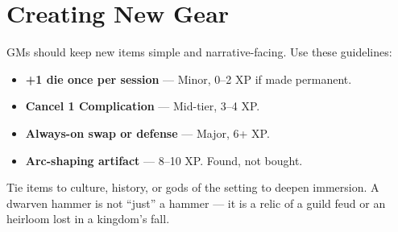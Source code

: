 \documentclass[12pt]{book}
\begin{document}
\section{Creating New Gear}
GMs should keep new items simple and narrative-facing. Use these guidelines:
\begin{itemize}
  \item \textbf{+1 die once per session} — Minor, 0–2 XP if made permanent.  
  \item \textbf{Cancel 1 Complication} — Mid-tier, 3–4 XP.  
  \item \textbf{Always-on swap or defense} — Major, 6+ XP.  
  \item \textbf{Arc-shaping artifact} — 8–10 XP. Found, not bought.  
\end{itemize}

Tie items to culture, history, or gods of the setting to deepen immersion.  
A dwarven hammer is not “just” a hammer — it is a relic of a guild feud or an heirloom lost in a kingdom’s fall.
\end{document}
